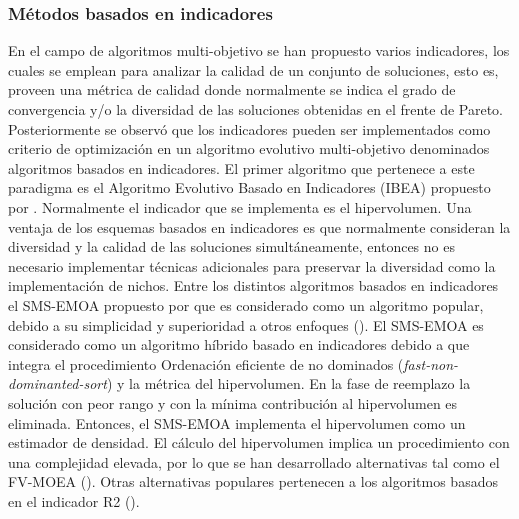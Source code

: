 \subsubsection{Métodos basados en indicadores}
%
En el campo de algoritmos multi-objetivo se han propuesto varios indicadores, los cuales se emplean para analizar la calidad de un conjunto de soluciones, esto es, proveen una métrica de calidad donde normalmente se indica el grado de convergencia y/o la diversidad de las soluciones obtenidas en el frente de Pareto.
%
Posteriormente se observó que los indicadores pueden ser implementados como criterio de optimización en un algoritmo evolutivo multi-objetivo denominados algoritmos basados en indicadores.
%
El primer algoritmo que pertenece a este paradigma es el Algoritmo Evolutivo Basado en Indicadores (IBEA) propuesto por \cite{Joel:IBEA}.
%
Normalmente el indicador que se implementa es el hipervolumen.
%
Una ventaja de los esquemas basados en indicadores es que normalmente consideran la diversidad y la calidad de las soluciones simultáneamente, entonces no es necesario implementar técnicas adicionales para preservar la diversidad como la implementación de nichos.
%
Entre los distintos algoritmos basados en indicadores el SMS-EMOA propuesto por \cite{Joel:SMSEMOA} que es considerado como un algoritmo popular, debido a su simplicidad y superioridad a otros enfoques (\cite{Joel:PARALLEL_SMSEMOA}).
%
El SMS-EMOA es considerado como un algoritmo híbrido basado en indicadores debido a que integra el procedimiento Ordenación eficiente de no dominados (\textit{fast-non-dominanted-sort}) y la métrica del hipervolumen. 
%
En la fase de reemplazo la solución con peor rango y con la mínima contribución al hipervolumen es eliminada.
%
Entonces, el SMS-EMOA implementa el hipervolumen como un estimador de densidad. 
%
El cálculo del hipervolumen implica un procedimiento con una complejidad elevada, por lo que se han desarrollado alternativas tal como el FV-MOEA (\cite{Joel:FV-MOEA}). 
%
Otras alternativas populares pertenecen a los algoritmos basados en el indicador R2 (\cite{Joel:IMPROVED_METAHEURISTIC_R2, Joel:R2_INDICATOR_BASED}).

